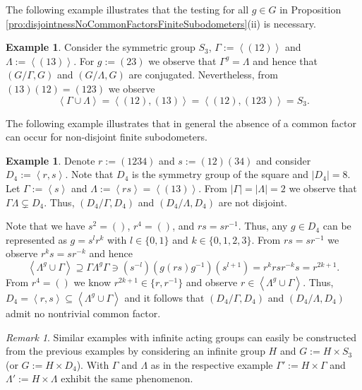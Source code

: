 \documentclass[12pt, reqno]{amsart}
\theoremstyle{definition}
\newtheorem{example}[theorem]{Example}
\theoremstyle{remark}
\newtheorem{remark}[theorem]{Remark}
\numberwithin{equation}{section}
\theoremstyle{theorem}
\theoremstyle{remark}
\newcommand{\grouphull}[1]{\left\langle #1 \right\rangle}
\begin{document}
The following example illustrates that the testing for all $g\in G$ in Proposition \ref{pro:disjointnessNoCommonFactorsFiniteSubodometers}(ii) is necessary. 

\begin{example}
\label{exa:noCommonFactorsCondition}
    Consider the symmetric group $S_3$, $\Gamma:=\grouphull{(12)}$ and $\Lambda:=\grouphull{(13)}$. 
    For $g:=(23)$ we observe that $\Gamma^g=\Lambda$ and hence that $(G/\Gamma,G)$ and $(G/\Lambda,G)$ are conjugated. 
    Nevertheless, from $(13)(12)=(123)$ we observe 
    \[\grouphull{\Gamma\cup \Lambda}=\grouphull{(12),(13)}=\grouphull{(12),(123)}=S_3.\] 
\end{example}

The following example illustrates that in general the absence of a common factor can occur for non-disjoint finite subodometers. 

\begin{example}
\label{exa:subodometersNoCommonFactors}
    Denote $r:=(1234)$ and $s:=(12)(34)$ and consider $D_4:=\grouphull{r,s}$. 
    Note that $D_4$ is the symmetry group of the square and $|D_4|=8$. 
    Let $\Gamma:=\grouphull{s}$ and 
    $\Lambda:=\grouphull{rs}=\grouphull{(13)}$. 
    From $|\Gamma|=|\Lambda|=2$ we observe that $\Gamma\Lambda\subsetneq D_4$.
    Thus, $(D_4/\Gamma,D_4)$ and $(D_4/\Lambda,D_4)$ are not disjoint.

    Note that we have 
    $s^2=()$, 
    $r^4=()$,
    and $rs=sr^{-1}$. 
    Thus, any $g\in D_4$ can be represented as $g=s^lr^k$ with $l\in \{0,1\}$ and $k\in \{0,1,2,3\}$. 
    From $rs=sr^{-1}$ we observe $r^ks=sr^{-k}$ and hence
    \[\grouphull{\Lambda^g\cup \Gamma}
    \supseteq \Gamma \Lambda^g \Gamma\ni (s^{-l})(g(rs)g^{-1})(s^{l+1})
    =r^krsr^{-k}s=r^{2k+1}.\]
    From $r^4=()$ we know $r^{2k+1}\in \{r,r^{-1}\}$ and observe $r\in \grouphull{\Lambda^g\cup \Gamma}$.
    Thus, $D_4=\grouphull{r,s}\subseteq \grouphull{\Lambda^g\cup \Gamma}$ and it follows that $(D_4/\Gamma,D_4)$ and $(D_4/\Lambda,D_4)$ admit no nontrivial common factor. 
\end{example}

\begin{remark}
    Similar examples with infinite acting groups can easily be constructed from the previous examples by considering an infinite group $H$ and $G:=H\times S_3$ (or $G:=H\times D_4$). 
    With $\Gamma$ and $\Lambda$ as in the respective example 
    $\Gamma':=H\times \Gamma$ and $\Lambda':=H\times \Lambda$ exhibit the same phenomenon. 
\end{remark}
\end{document}
